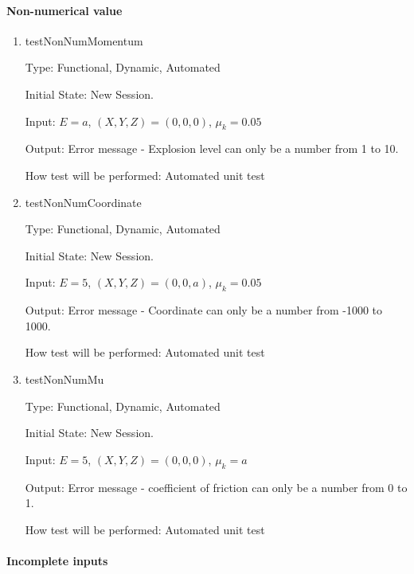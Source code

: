 \documentclass[12pt, titlepage]{article}
\begin{document}
\paragraph{Non-numerical value}

\begin{enumerate}

\item{testNonNumMomentum\\}

Type: Functional, Dynamic, Automated

Initial State: New Session.

Input: $E = a$, $(X,Y,Z) = (0,0,0)$, $\mu_{k} = 0.05$  

Output: Error message - Explosion level can only be a number from 1 to 10.

How test will be performed: Automated unit test

\item{testNonNumCoordinate\\}

Type: Functional, Dynamic, Automated

Initial State: New Session.

Input: $E = 5$, $(X,Y,Z) = (0,0,a)$, $\mu_{k} = 0.05$  

Output: Error message - Coordinate can only be a number from -1000 to 1000.

How test will be performed: Automated unit test

\item{testNonNumMu\\}

Type: Functional, Dynamic, Automated

Initial State: New Session.

Input: $E = 5$, $(X,Y,Z) = (0,0,0)$, $\mu_{k} = a$  

Output: Error message - coefficient of friction can only be a number from 0 to 1.

How test will be performed: Automated unit test

\end{enumerate}

\paragraph{Incomplete inputs}
\end{document}

